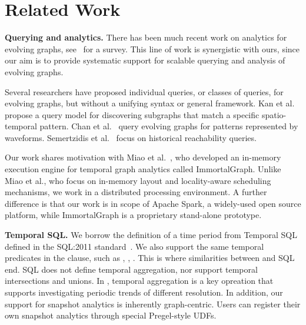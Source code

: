 \section{Related Work}
\label{sec:related}

{\bf Querying and analytics.} There has been much recent work on
analytics for evolving graphs,
see~\cite{DBLP:journals/csur/AggarwalS14} for a survey. This line of
work is synergistic with ours, since our aim is to provide systematic
support for scalable querying and analysis of evolving graphs.

Several researchers have proposed individual queries, or classes of
queries, for evolving graphs, but without a unifying syntax or general
framework.  Kan et al.~\cite{Kan2009} propose a query model for
discovering subgraphs that match a specific spatio-temporal pattern.
Chan et al.~\cite{Chan2008} query evolving graphs for patterns
represented by waveforms.  Semertzidis et al.~\cite{Semertzidis2015}
focus on historical reachability queries.

Our work shares motivation with Miao et
al.~\cite{DBLP:journals/tos/MiaoHLWYZPCC15}, who developed an
in-memory execution engine for temporal graph analytics called
ImmortalGraph.  Unlike Miao et al., who focus on in-memory layout and
locality-aware scheduling mechanisms, we work in a distributed
processing environment.  A further difference is that our work is in
scope of Apache Spark, a widely-used open source platform, while
ImmortalGraph is a proprietary stand-alone prototype.


{\bf Temporal SQL.}  We borrow the definition of a time period from
Temporal SQL defined in the SQL:2011
standard~\cite{DBLP:journals/sigmod/KulkarniM12}.  We also support the
same temporal predicates in the  clause, such as
, , .  This is where
similarities between \ql and SQL end.  SQL does not define temporal
aggregation, nor support temporal intersections and unions.  In \ql,
temporal aggregation is a key opreation that supports investigating
periodic trends of different resolution.  In addition, our support for
snapshot analytics is inherently graph-centric.  Users can register
their own snapshot analytics through special Pregel-style UDFs.

